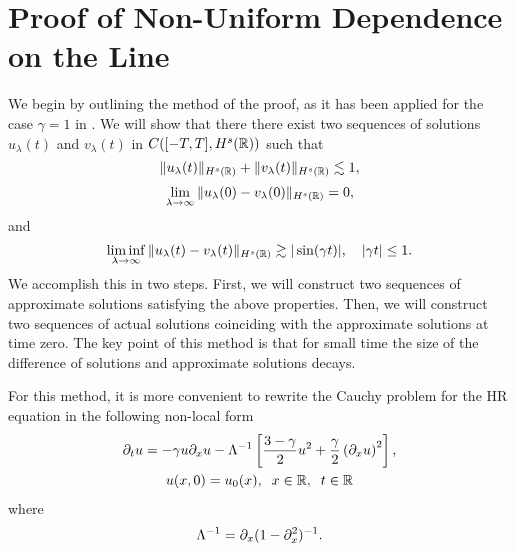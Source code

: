 \section{Proof of Non-Uniform Dependence on the Line}
\label{sec:2}
%
%
%
%
We begin by outlining the method of the proof,
as it has been applied for the case $\gamma=1$ in \cite{Himonas:2009fk}.
We will show  that there there exist two sequences of solutions 
$u_{\lambda}(t)$
and $v_{\lambda}(t)$ in $C([-T, T], H^s(\mathbb{R}))$ such that
%
%
%
%
\begin{equation}
\label{h-s-bdd}
\| u_{\lambda}(t)  \|_{H^s(\mathbb{R})}
+
\| v_{\lambda}(t)  \|_{H^s(\mathbb{R})}
\lesssim
1,
\end{equation}
%
%
%
%
%
\begin{equation}
\label{zero-limit-at-0}
\lim_{\lambda \to\infty}
\|
u_{\lambda}(0)
-
v_{\lambda}(0)
\|_{H^s(\mathbb{R})}
=
0,
\end{equation}
%
%
%
%
and
%
%
%
%
\begin{equation}
\label{bdd-away-from-0}
\liminf_{\lambda \to\infty}
\|
u_{\lambda}(t)
-
v_{\lambda}(t)
\|_{H^s(\mathbb{R})}
\gtrsim
|\sin ( \gamma t)|,
\quad
| \gamma t|\le 1.
\end{equation}%
%
%
We accomplish this in two steps.
First, we will construct two sequences of approximate solutions
satisfying the above properties.
Then, we will construct two sequences of actual solutions 
coinciding with the approximate solutions at time zero.
The key point of this method is that 
for small time the size of the difference of solutions and approximate solutions
decays.

%
%
For this method, it is more convenient 
to rewrite the Cauchy problem for the HR equation 
in the following non-local form
%
%
\begin{gather}
\partial_t u =  -\gamma u \partial_x u -
\Lambda^{-1} \left[ \frac{3-\gamma}{2}u^2 +
\frac{\gamma}{2} \left( \partial_x u \right)^2
\right],
\label{apple1'}
\\
 u(x,0) = u_0(x), \; \; x \in \mathbb{R}, \; \; t \in \mathbb{R}
\label{apple2'}
\end{gather}
%
%
where 
\begin{equation*}
\Lambda^{-1} = \partial_x (1 - \partial_x^2)^{-1}.
\end{equation*}
%
%
%
%
%
%

